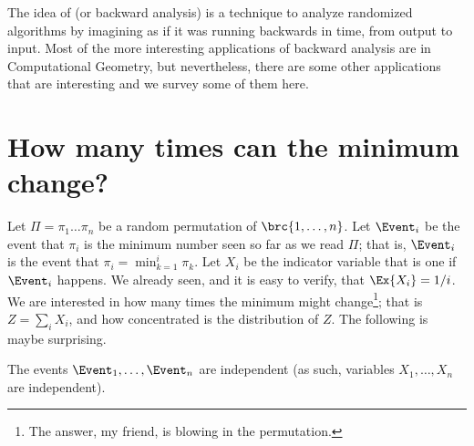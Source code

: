 \makeatletter
{}
\makeatother
\ifx\bookMode\undefined%
\fi
{}


\ChapterPrefix{}
\ChapterGen{}


The idea of  (or backward analysis) is a
technique to analyze randomized algorithms by imagining as if it was
running backwards in time, from output to input. Most of the more
interesting applications of backward analysis are in Computational
Geometry, but nevertheless, there are some other applications that are
interesting and we survey some of them here.


\section{How many times can the minimum change?}


Let $\Pi = \pi_1 \ldots \pi_n$ be a random permutation of
$\brc{1, \ldots, n}$. Let $\Event_i$ be the event that $\pi_i$ is the
minimum number seen so far as we read $\Pi$; that is, $\Event_i$ is
the event that $\pi_i = \min_{k=1}^i \pi_k$. Let $X_i$ be the
indicator variable that is one if $\Event_i$ happens. We already seen,
and it is easy to verify, that $\Ex{X_i} = 1/i$. We are interested in
how many times the minimum might change\footnote{The answer, my
   friend, is blowing in the permutation.}; that is $Z=\sum_i X_i$,
and how concentrated is the distribution of $Z$.  The following is
maybe surprising.

\begin{lemma}%
    The events $\Event_1, \ldots, \Event_n$ are independent (as such,
    variables $X_1, \ldots, X_n$ are independent).
\end{lemma}

